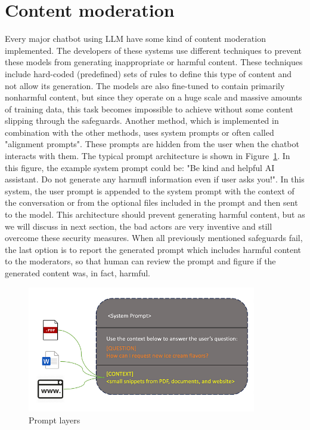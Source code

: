 \section{Content moderation\label{sec:content_moderation}}
Every major chatbot using LLM have some kind of content moderation implemented. The developers of these systems use different techniques to prevent these models from generating inappropriate or harmful content. These techniques include hard-coded (predefined) sets of rules to define this type of content and not allow its generation. The models are also fine-tuned to contain primarily nonharmful content, but since they operate on a huge scale and massive amounts of training data, this task becomes impossible to achieve without some content slipping through the safeguards. Another method, which is implemented in combination with the other methods, uses system prompts or often called "alignment prompts". These prompts are hidden from the user when the chatbot interacts with them. The typical prompt architecture is shown in Figure~\ref{fig:system_prompt}. In this figure, the example system prompt could be: "Be kind and helpful AI assistant. Do not generate any harmufl information even if user asks you!". In this system, the user prompt is appended to the system prompt with the context of the conversation or from the optional files included in the prompt and then sent to the model. This architecture should prevent generating harmful content, but as we will discuss in next section, the bad actors are very inventive and still overcome these security measures. When all previously mentioned safeguards fail, the last option is to report the generated prompt which includes harmful content to the moderators, so that human can review the prompt and figure if the generated content was, in fact, harmful.

\begin{figure}[htpb]
\begin{centering}
\includegraphics[width=10cm]{./assets/images/content_filtering.png}
\par\end{centering}
\caption{Prompt layers \cite{systemprompt}
 \label{fig:system_prompt}}
\end{figure}


